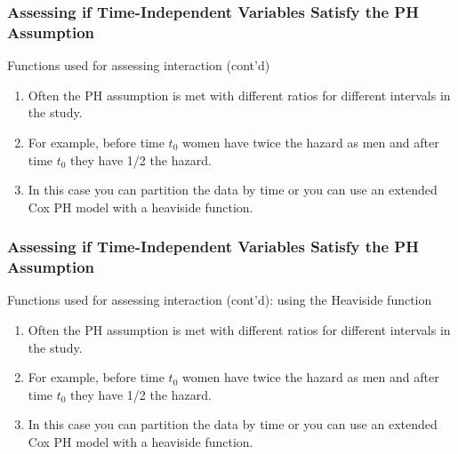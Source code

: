 \documentclass{beamer}
\theoremstyle{definition}
\begin{document}
\begin{frame}
\frametitle{Assessing if Time-Independent Variables Satisfy the PH Assumption}
\begin{block}{Functions used for assessing interaction (cont'd)}
\begin{enumerate}
\item Often the PH assumption is met with different ratios for different intervals in the study. 
\item For example, before time $t_0$ women have twice the hazard as men and after time $t_0$ they have 1/2 the hazard. 
\item In this case you can partition the data by time or you can use an extended Cox PH model with a heaviside function. 
\end{enumerate} 
\end{block}
\end{frame}  

\begin{frame}
\frametitle{Assessing if Time-Independent Variables Satisfy the PH Assumption}
\begin{block}{Functions used for assessing interaction (cont'd): using the Heaviside function}
\begin{enumerate}
\item Often the PH assumption is met with different ratios for different intervals in the study.
\item For example, before time $t_0$ women have twice the hazard as men and after time $t_0$ they have 1/2 the hazard.
\item In this case you can partition the data by time or you can use an extended Cox PH model with a heaviside function.
\end{enumerate}
\end{block}
\end{frame}  
\end{document}
